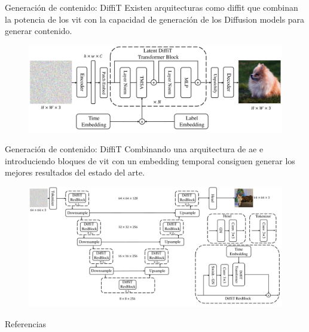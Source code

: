 \begin{frame}{Generación de contenido: DiffiT}
Existen arquitecturas como \alert{\gls{diffit}} \cite{hatamizadeh2024diffit} que combinan la potencia de los \gls{vit} con la capacidad de generación de los \alert{Diffusion models} para generar contenido.

\begin{figure}
    \centering
    \includegraphics[width=\textwidth]{figures/Vision_Transformers/DiffiT_Architecture.png}
    \caption{\cite{hatamizadeh2024diffit}}
\end{figure}
\end{frame}

\begin{frame}{Generación de contenido: DiffiT}
Combinando una arquitectura de \alert{\gls{ae}} e introduciendo bloques de \gls{vit} con un \alert{embedding temporal} consiguen generar los mejores resultados del estado del arte.

\begin{figure}
    \centering
    \includegraphics[width=\textwidth]{figures/Vision_Transformers/DiffiT_Transformer.png}
    \caption{\cite{hatamizadeh2024diffit}}
\end{figure}
\end{frame}


\begin{frame}[allowframebreaks]{Referencias}
    
    
\end{frame}

